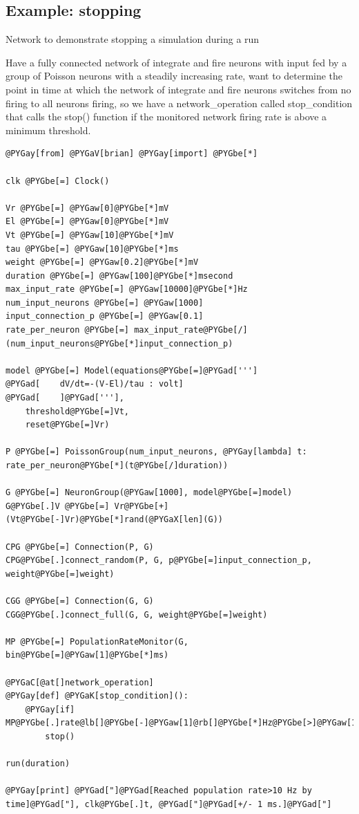 \documentclass[letterpaper,10pt]{manual}
\begin{document}
\resetcurrentobjects
{}

\hypertarget{index-55}{}\subsection{Example: stopping}

Network to demonstrate stopping a simulation during a run

Have a fully connected network of integrate and fire neurons
with input fed by a group of Poisson neurons with a steadily
increasing rate, want to determine the point in time at which
the network of integrate and fire neurons switches from no
firing to all neurons firing, so we have a network\_operation
called stop\_condition that calls the stop() function if the
monitored network firing rate is above a minimum threshold.

\begin{Verbatim}[commandchars=@\[\]]
@PYGay[from] @PYGaV[brian] @PYGay[import] @PYGbe[*]

clk @PYGbe[=] Clock()

Vr @PYGbe[=] @PYGaw[0]@PYGbe[*]mV
El @PYGbe[=] @PYGaw[0]@PYGbe[*]mV
Vt @PYGbe[=] @PYGaw[10]@PYGbe[*]mV
tau @PYGbe[=] @PYGaw[10]@PYGbe[*]ms
weight @PYGbe[=] @PYGaw[0.2]@PYGbe[*]mV
duration @PYGbe[=] @PYGaw[100]@PYGbe[*]msecond
max_input_rate @PYGbe[=] @PYGaw[10000]@PYGbe[*]Hz
num_input_neurons @PYGbe[=] @PYGaw[1000]
input_connection_p @PYGbe[=] @PYGaw[0.1]
rate_per_neuron @PYGbe[=] max_input_rate@PYGbe[/](num_input_neurons@PYGbe[*]input_connection_p)

model @PYGbe[=] Model(equations@PYGbe[=]@PYGad[''']
@PYGad[    dV/dt=-(V-El)/tau : volt]
@PYGad[    ]@PYGad['''],
    threshold@PYGbe[=]Vt,
    reset@PYGbe[=]Vr)

P @PYGbe[=] PoissonGroup(num_input_neurons, @PYGay[lambda] t: rate_per_neuron@PYGbe[*](t@PYGbe[/]duration))

G @PYGbe[=] NeuronGroup(@PYGaw[1000], model@PYGbe[=]model)
G@PYGbe[.]V @PYGbe[=] Vr@PYGbe[+](Vt@PYGbe[-]Vr)@PYGbe[*]rand(@PYGaX[len](G))

CPG @PYGbe[=] Connection(P, G)
CPG@PYGbe[.]connect_random(P, G, p@PYGbe[=]input_connection_p, weight@PYGbe[=]weight)

CGG @PYGbe[=] Connection(G, G)
CGG@PYGbe[.]connect_full(G, G, weight@PYGbe[=]weight)

MP @PYGbe[=] PopulationRateMonitor(G, bin@PYGbe[=]@PYGaw[1]@PYGbe[*]ms)

@PYGaC[@at[]network_operation]
@PYGay[def] @PYGaK[stop_condition]():
    @PYGay[if] MP@PYGbe[.]rate@lb[]@PYGbe[-]@PYGaw[1]@rb[]@PYGbe[*]Hz@PYGbe[>]@PYGaw[10]@PYGbe[*]Hz:
        stop()

run(duration)

@PYGay[print] @PYGad["]@PYGad[Reached population rate>10 Hz by time]@PYGad["], clk@PYGbe[.]t, @PYGad["]@PYGad[+/- 1 ms.]@PYGad["]
\end{Verbatim}
\end{document}
